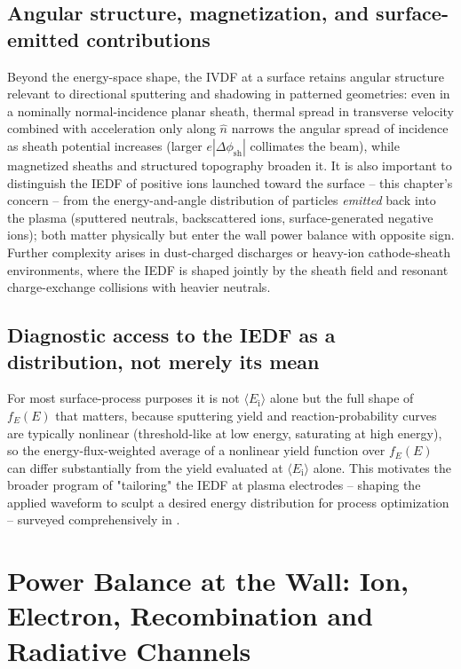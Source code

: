 \subsection{Angular structure, magnetization, and surface-emitted contributions}

Beyond the energy-space shape, the IVDF at a surface retains angular structure relevant to directional sputtering and shadowing in patterned geometries: even in a nominally normal-incidence planar sheath, thermal spread in transverse velocity combined with acceleration only along $\hat n$ narrows the angular spread of incidence as sheath potential increases (larger $e|\Delta\phi_{\mathrm{sh}}|$ collimates the beam), while magnetized sheaths and structured topography broaden it. It is also important to distinguish the IEDF of positive ions launched toward the surface -- this chapter's concern -- from the energy-and-angle distribution of particles \emph{emitted} back into the plasma (sputtered neutrals, backscattered ions, surface-generated negative ions); both matter physically but enter the wall power balance with opposite sign. Further complexity arises in dust-charged discharges or heavy-ion cathode-sheath environments, where the IEDF is shaped jointly by the sheath field and resonant charge-exchange collisions with heavier neutrals.

\subsection{Diagnostic access to the IEDF as a distribution, not merely its mean}

For most surface-process purposes it is not $\langle E_{\mathrm{i}}\rangle$ alone but the full shape of $f_E(E)$ that matters, because sputtering yield and reaction-probability curves are typically nonlinear (threshold-like at low energy, saturating at high energy), so the energy-flux-weighted average of a nonlinear yield function over $f_E(E)$ can differ substantially from the yield evaluated at $\langle E_{\mathrm{i}}\rangle$ alone. This motivates the broader program of "tailoring" the IEDF at plasma electrodes -- shaping the applied waveform to sculpt a desired energy distribution for process optimization -- surveyed comprehensively in \cite{ref0105}.

\section{Power Balance at the Wall: Ion, Electron, Recombination and Radiative Channels}
\label{sec:power-balance}

